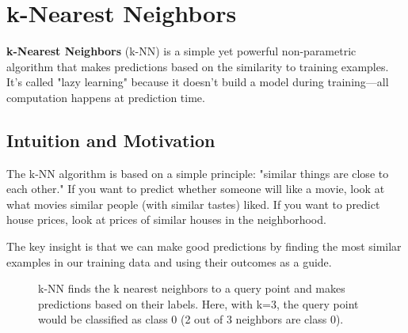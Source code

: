 
\section{k-Nearest Neighbors}
\label{sec:knn}

\textbf{k-Nearest Neighbors} (k-NN) is a simple yet powerful non-parametric algorithm that makes predictions based on the similarity to training examples. It's called "lazy learning" because it doesn't build a model during training—all computation happens at prediction time.

\subsection{Intuition and Motivation}

The k-NN algorithm is based on a simple principle: "similar things are close to each other." If you want to predict whether someone will like a movie, look at what movies similar people (with similar tastes) liked. If you want to predict house prices, look at prices of similar houses in the neighborhood.

The key insight is that we can make good predictions by finding the most similar examples in our training data and using their outcomes as a guide.

\begin{figure}[htbp]
\centering
{}
\caption{k-NN finds the k nearest neighbors to a query point and makes predictions based on their labels. Here, with k=3, the query point would be classified as class 0 (2 out of 3 neighbors are class 0).}
\label{fig:knn-example}
\end{figure}

